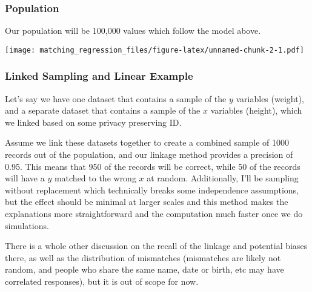 \documentclass[
]{article}
\newenvironment{Shaded}{\begin{snugshade}}{\end{snugshade}}
\newcommand{\DataTypeTok}[1]{\textcolor[rgb]{0.13,0.29,0.53}{#1}}
\newcommand{\DecValTok}[1]{\textcolor[rgb]{0.00,0.00,0.81}{#1}}
\newcommand{\FloatTok}[1]{\textcolor[rgb]{0.00,0.00,0.81}{#1}}
\newcommand{\KeywordTok}[1]{\textcolor[rgb]{0.13,0.29,0.53}{\textbf{#1}}}
\newcommand{\NormalTok}[1]{#1}
\newcommand{\OperatorTok}[1]{\textcolor[rgb]{0.81,0.36,0.00}{\textbf{#1}}}
\newcommand{\StringTok}[1]{\textcolor[rgb]{0.31,0.60,0.02}{#1}}
\begin{document}
\hypertarget{population}{%
\subsubsection{Population}\label{population}}

Our population will be 100,000 values which follow the model above.

\begin{Shaded}
\end{Shaded}

\texttt{[image: matching\_regression\_files/figure-latex/unnamed-chunk-2-1.pdf]}

\hypertarget{linked-sampling-and-linear-example}{%
\subsubsection{Linked Sampling and Linear
Example}\label{linked-sampling-and-linear-example}}

Let's say we have one dataset that contains a sample of the \(y\)
variables (weight), and a separate dataset that contains a sample of the
\(x\) variables (height), which we linked based on some privacy
preserving ID.

Assume we link these datasets together to create a combined sample of
1000 records out of the population, and our linkage method provides a
precision of 0.95. This means that 950 of the records will be correct,
while 50 of the records will have a \(y\) matched to the wrong \(x\) at
random. Additionally, I'll be sampling without replacement which
technically breaks some independence assumptions, but the effect should
be minimal at larger scales and this method makes the explanations more
straightforward and the computation much faster once we do simulations.

There is a whole other discussion on the recall of the linkage and
potential biases there, as well as the distribution of mismatches
(mismatches are likely not random, and people who share the same name,
date or birth, etc may have correlated responses), but it is out of
scope for now.
\end{document}
